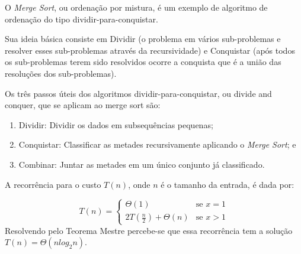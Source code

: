 \documentclass[12pt]{article}
\begin{document}
O \textit{Merge Sort}, ou ordenação por mistura, é um exemplo de algoritmo de ordenação do tipo dividir-para-conquistar.

Sua ideia básica consiste em Dividir (o problema em vários sub-problemas e resolver esses sub-problemas através da recursividade) e Conquistar (após todos os sub-problemas terem sido resolvidos ocorre a conquista que é a união das resoluções dos sub-problemas).

Os três passos úteis dos algoritmos dividir-para-conquistar, ou divide and conquer, que se aplicam ao merge sort são:

\begin{enumerate}
\item Dividir: Dividir os dados em subsequências pequenas;
\item Conquistar: Classificar as metades recursivamente aplicando o \textit{Merge Sort}; e
\item Combinar: Juntar as metades em um único conjunto já classificado.
\end{enumerate}

A recorrência para o custo $T(n)$, onde $n$ é o tamanho da entrada, é dada por:

$$T(n) =
\begin{cases}
    \Theta(1) & \text{se } x = 1 \\
    2T(\frac{n}{2}) + \Theta(n) & \text{se } x > 1
\end{cases}
$$
Resolvendo pelo Teorema Mestre percebe-se que essa recorrência tem a solução $T(n) = \Theta(nlog_2n)$.




\end{document}
